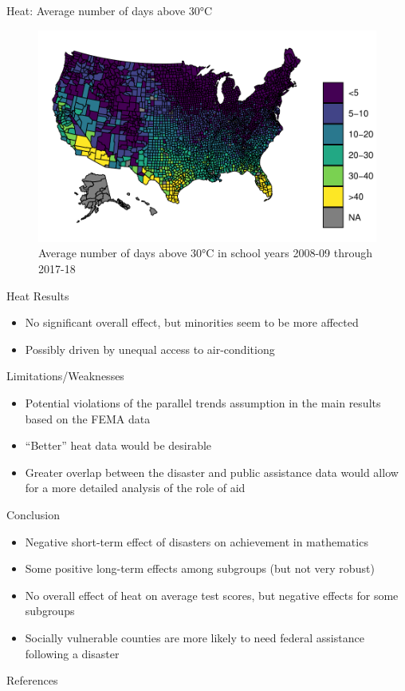 \documentclass[hyperref={colorlinks = true,linkcolor = blue, citecolor=blue,urlcolor=blue}]{beamer}
\begin{document}
\begin{frame}{Heat: Average number of days above 30°C}
	\begin{figure}[!h]
		\centering
		\includegraphics[scale=0.65]{"../Code & Data/HeatMapDays.pdf"}
		\caption{Average number of days above 30°C in school years 2008-09 through 2017-18}
		\label{HeatMapDays}
	\end{figure}
\end{frame}

\begin{frame}{Heat Results}
	\begin{itemize}
		\item No significant overall effect, but minorities seem to be more affected
		\item Possibly driven by unequal access to air-conditiong \citep{Goodman_2020}
	\end{itemize}
	
\end{frame}

\begin{frame}{Limitations/Weaknesses}
	\begin{itemize}
		\item Potential violations of the parallel trends assumption in the main results based on the FEMA data
		\item ``Better'' heat data would be desirable
		\item Greater overlap between the disaster and public assistance data would allow for a more detailed analysis of the role of aid
	\end{itemize}
\end{frame}

\begin{frame}{Conclusion}
	\begin{itemize}
		\item Negative short-term effect of disasters on achievement in mathematics
		\item Some positive long-term effects among subgroups (but not very robust)
		\item No overall effect of heat on average test scores, but negative effects for some subgroups
		\item Socially vulnerable counties are more likely to need federal assistance following a disaster
	\end{itemize}
\end{frame}



\begin{frame}{References}
	
	
\end{frame}
\end{document}
